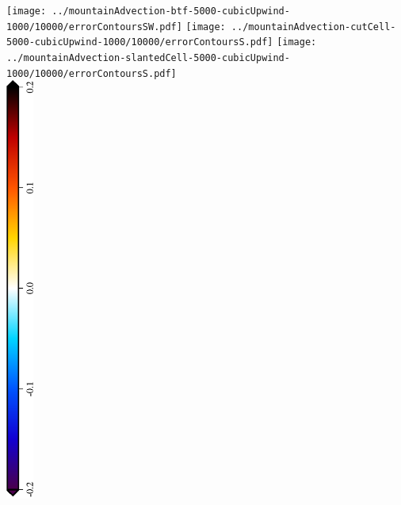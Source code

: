 \documentclass{article}
\begin{document}
\texttt{[image: ../mountainAdvection-btf-5000-cubicUpwind-1000/10000/errorContoursSW.pdf]}
\texttt{[image: ../mountainAdvection-cutCell-5000-cubicUpwind-1000/10000/errorContoursS.pdf]}
\texttt{[image: ../mountainAdvection-slantedCell-5000-cubicUpwind-1000/10000/errorContoursS.pdf]} \\
\centering
\includegraphics[height=5.5in,angle=270]{mountainAdvectionErrorLegend.eps}
\end{document}
